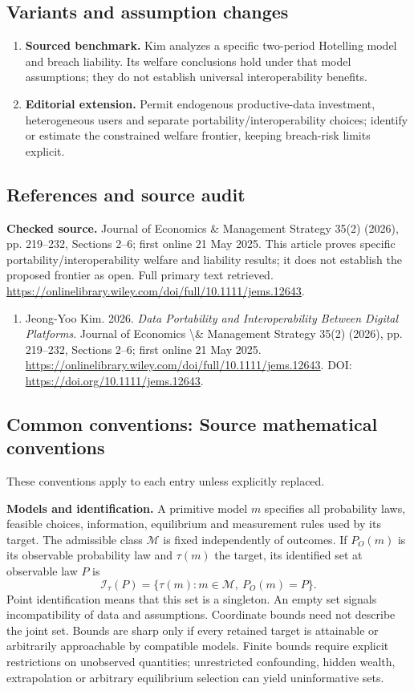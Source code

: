 \documentclass[11pt,a4paper]{article}
\begin{document}
\subsection*{Variants and assumption changes}
\begin{enumerate}
\item \textbf{Sourced benchmark.} Kim analyzes a specific two-period Hotelling model and breach liability. Its welfare conclusions hold under that model assumptions; they do not establish universal interoperability benefits.
\item \textbf{Editorial extension.} Permit endogenous productive-data investment, heterogeneous users and separate portability/interoperability choices; identify or estimate the constrained welfare frontier, keeping breach-risk limits explicit.
\end{enumerate}
\subsection*{References and source audit}
\textbf{Checked source.} Journal of Economics \& Management Strategy 35(2) (2026), pp. 219--232, Sections 2--6; first online 21 May 2025. This article proves specific portability/interoperability welfare and liability results; it does not establish the proposed frontier as open. Full primary text retrieved. \url{https://onlinelibrary.wiley.com/doi/full/10.1111/jems.12643}.
\begin{enumerate}\raggedright
\item\hypertarget{definitions:source:30007691:1}{} Jeong-Yoo Kim. 2026. \emph{Data Portability and Interoperability Between Digital Platforms}. Journal of Economics \textbackslash{}\& Management Strategy 35(2) (2026), pp. 219--232, Sections 2--6; first online 21 May 2025.
\url{https://onlinelibrary.wiley.com/doi/full/10.1111/jems.12643}.
DOI: \url{https://doi.org/10.1111/jems.12643}.
\end{enumerate}

\subsection*{Common conventions: Source mathematical conventions}

These conventions apply to each entry unless explicitly replaced.

\textbf{Models and identification.} A primitive model \(m\) specifies all probability laws, feasible choices, information, equilibrium and measurement rules used by its target. The admissible class \(\mathcal M\) is fixed independently of outcomes. If \(P_O(m)\) is its observable probability law and \(\tau(m)\) the target, its identified set at observable law \(P\) is
\[
 \mathcal I_\tau(P)=\{\tau(m):m\in\mathcal M,\ P_O(m)=P\}.
\]
Point identification means that this set is a singleton. An empty set signals incompatibility of data and assumptions. Coordinate bounds need not describe the joint set. Bounds are sharp only if every retained target is attainable or arbitrarily approachable by compatible models. Finite bounds require explicit restrictions on unobserved quantities; unrestricted confounding, hidden wealth, extrapolation or arbitrary equilibrium selection can yield uninformative sets.
\end{document}
